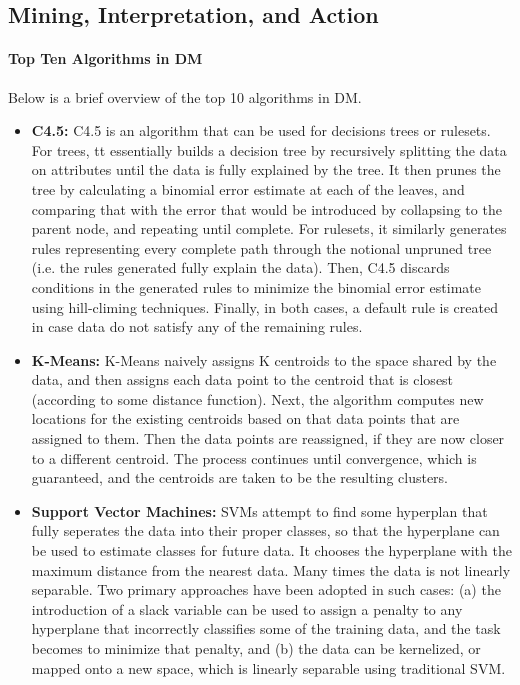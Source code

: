 \documentclass[fleqn,10pt]{SelfArx} %
\begin{document}
\subsection{Mining, Interpretation, and Action}

\paragraph{Top Ten Algorithms in DM}
Below is a brief overview of the top 10 algorithms in DM. \cite{Wu:2007:TAD:1327434.1327436}

\begin{itemize}
	\item{\textbf{C4.5:}} C4.5 is an algorithm that can be used for decisions trees or rulesets. For trees, tt essentially builds a decision tree by recursively splitting the data on attributes until the data is fully explained by the tree.  It then prunes the tree by calculating a binomial error estimate at each of the leaves, and comparing that with the error that would be introduced by collapsing to the parent node, and repeating until complete.  For rulesets, it similarly generates rules representing every complete path through the notional unpruned tree (i.e. the rules generated fully explain the data).  Then, C4.5 discards conditions in the generated rules to minimize the binomial error estimate using hill-climing techniques.  Finally, in both cases, a default rule is created in case data do not satisfy any of the remaining rules.
	\item{\textbf{K-Means:}} K-Means naively assigns K centroids to the space shared by the data, and then assigns each data point to the centroid that is closest (according to some distance function).  Next, the algorithm computes new locations for the existing centroids based on that data points that are assigned to them.  Then the data points are reassigned, if they are now closer to a different centroid.  The process continues until convergence, which is guaranteed, and the centroids are taken to be the resulting clusters.
	\item{\textbf{Support Vector Machines:}} SVMs attempt to find some hyperplan that fully seperates the data into their proper classes, so that the hyperplane can be used to estimate classes for future data.  It chooses the hyperplane with the maximum distance from the nearest data.  Many times the data is not linearly separable.  Two primary approaches have been adopted in such cases: (a) the introduction of a slack variable can be used to assign a penalty to any hyperplane that incorrectly classifies some of the training data, and the task becomes to minimize that penalty, and (b) the data can be kernelized, or mapped onto a new space, which is linearly separable using traditional SVM. 

\end{itemize}
\end{document}
